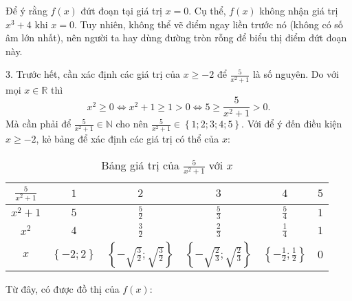 Để ý rằng $f(x)$ đứt đoạn tại giá trị $x = 0$. Cụ thể, $f(x)$ không nhận giá trị $x^3 + 4$ khi $x = 0$. Tuy nhiên, không thể vẽ điểm ngay liền trước nó (không có số âm lớn nhất), nên người ta hay dùng đường tròn rỗng để biểu thị điểm đứt đoạn này.

3. Trước hết, cần xác định các giá trị của $x \geq -2$ để $\frac{5}{x^2 + 1}$ là số nguyên. Do với mọi $x \in \mathbb{R}$ thì $$x^2 \geq 0 \iff x^2 + 1 \geq 1 > 0 \iff 5 \geq \frac{5}{x^2 + 1} > 0.$$ Mà cần phải để $\frac{5}{x^2 + 1} \in \mathbb{N}$ cho nên $\frac{5}{x^2 + 1} \in \left\{1; 2; 3; 4; 5\right\}$. Với để ý đến điều kiện $x \geq -2$, kẻ bảng để xác định các giá trị có thể của $x$:

\begin{table}[H]
   \centering
   \begin{tabular}{|c|c|c|c|c|c|}
   \hline
   $\displaystyle \frac{5}{x^2 + 1}$ & $1$ & $2$ & $3$ & $4$ & $5$ \\
   \hline
   $x^2 + 1$ & $5$ & $\displaystyle\frac{5}{2}$ & $\displaystyle\frac{5}{3}$ & $\displaystyle\frac{5}{4}$ & $1$ \\
   \hline
   $x^2$ & $4$ & $\displaystyle\frac{3}{2}$ & $\displaystyle\frac{2}{3}$ & $\displaystyle\frac{1}{4}$ & $1$ \\
   \hline
   $x$ & $\left\{-2; 2\right\}$ & $\left\{-\sqrt{\frac{3}{2}}; \sqrt{\frac{3}{2}}\right\}$ & $\left\{-\sqrt{\frac{2}{3}}; \sqrt{\frac{2}{3}}\right\}$ & $\left\{-\frac{1}{2}; \frac{1}{2}\right\}$ & $0$ \\
   \hline
   \end{tabular}
   \caption{Bảng giá trị của $\frac{5}{x^2 + 1}$ với $x$} 
\end{table}

Từ đây, có được đồ thị của $f(x)$:

